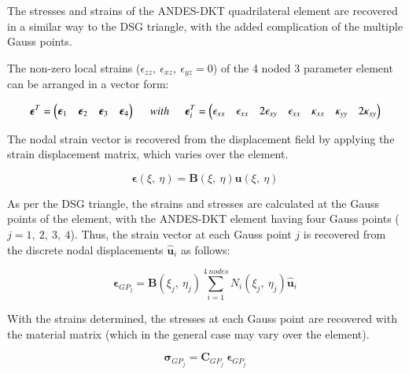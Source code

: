 The stresses and strains of the ANDES-DKT quadrilateral element are recovered in a similar way to the DSG triangle, with the added complication of the multiple Gauss points.

The non-zero local strains ($\epsilon_{zz},\ \epsilon_{xz},\ \epsilon_{yz} = 0$) of the 4 noded 3 parameter element can be arranged in a vector form:

\begin{equation} 
\boldsymbol{\epsilon}^T = \begin{pmatrix}
\boldsymbol{\epsilon}_1 & \boldsymbol{\epsilon}_2 & \boldsymbol{\epsilon}_3 & \boldsymbol{\epsilon}_4
\end{pmatrix}
\hspace{5mm}
with
\hspace{5mm}
\boldsymbol{\epsilon}^T_i = \begin{pmatrix}
\epsilon_{xx} & \epsilon_{xx} & 2\epsilon_{xy} & \epsilon_{xx} & \kappa_{xx} & \kappa_{yy} & 2\kappa_{xy} 
\end{pmatrix}
\label{eqqrec1}
\end{equation}

The nodal strain vector is recovered from the displacement field by applying the strain displacement matrix, which varies over the element.

\begin{equation} 
\boldsymbol{\epsilon}(\xi,\ \eta) = \mathbf{B}(\xi,\ \eta) \mathbf{u}(\xi,\ \eta)
\label{eqqrec2}
\end{equation}

As per the DSG triangle, the strains and stresses are calculated at the Gauss points of the element, with the ANDES-DKT element having four Gauss points ($j = 1,\ 2,\ 3,\ 4$). Thus, the strain vector at each Gauss point $j$ is recovered from the discrete nodal displacements $\hat{\mathbf{u}}_i$ as follows:

\begin{equation} 
\boldsymbol{\epsilon}_{GP_j} = \mathbf{B}(\xi_j,\ \eta_j) \sum_{i=1}^{4\ nodes} N_i(\xi_j,\ \eta_j) \hat{\mathbf{u}}_i
\label{eqqrec3}
\end{equation}

With the strains determined, the stresses at each Gauss point are recovered with the material matrix (which in the general case may vary over the element).

\begin{equation} 
\boldsymbol{\sigma}_{GP_j} = \mathbf{C}_{GP_j}\ \boldsymbol{\epsilon}_{GP_j}
\label{eqqrec4}
\end{equation}

